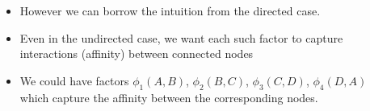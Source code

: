 \begin{frame}
	\begin{columns}
		\begin{overlayarea}{\textwidth}{\textheight}
		\vspace{0.1in}
		\begin{center}
		\end{center}
		\end{overlayarea}
		\begin{overlayarea}{\textwidth}{\textheight}
			\begin{itemize}\justifying
			\item<1-> However we can borrow the intuition from the directed case.
			\item<2-> Even in the undirected case, we want each such factor to capture interactions (affinity) between connected nodes
			\item<3-> We could have factors $\phi_1(A,B)$, $\phi_2(B,C)$, $\phi_3(C,D)$, $\phi_4(D,A)$ which capture the affinity between the corresponding nodes.
			\end{itemize}
		\end{overlayarea}
	\end{columns}
\end{frame}

